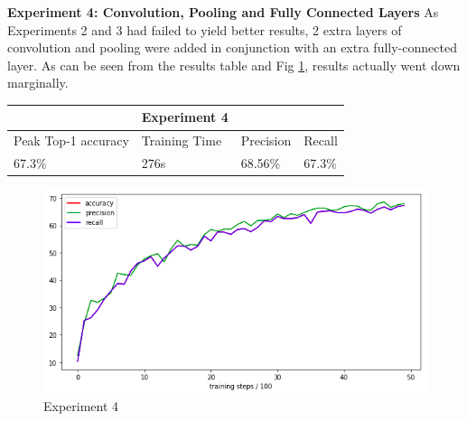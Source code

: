 \documentclass[12pt]{report}
\begin{document}
\newpage
\begin{flushleft}
\vspace{0.5cm}
\textbf{Experiment 4: Convolution, Pooling and Fully Connected Layers}
\linebreak
As Experiments 2 and 3 had failed to yield better results, 2 extra layers of convolution and pooling were added in conjunction with an extra fully-connected layer. As can be seen from the results table and Fig \ref{fig:experiment-4}, results actually went down marginally.

\vspace{0.5cm}
\begin{tabular}{llll}
                                          & \multicolumn{1}{c}{Experiment 4}   &                                &                             \\ \hline
\multicolumn{1}{|l|}{Peak Top-1 accuracy} & \multicolumn{1}{l|}{Training Time} & \multicolumn{1}{l|}{Precision} & \multicolumn{1}{l|}{Recall} \\ \hline
\multicolumn{1}{|l|}{67.3\%}              & \multicolumn{1}{l|}{276s}          & \multicolumn{1}{l|}{68.56\%}   & \multicolumn{1}{l|}{67.3\%} \\ \hline
\end{tabular}

\vspace{0.5cm}
\begin{figure}[h]
	\centering
	\includegraphics[width=12cm]{experiment-4}
	\caption{Experiment 4}
	\label{fig:experiment-4}
\end{figure}
\end{flushleft}
\end{document}
